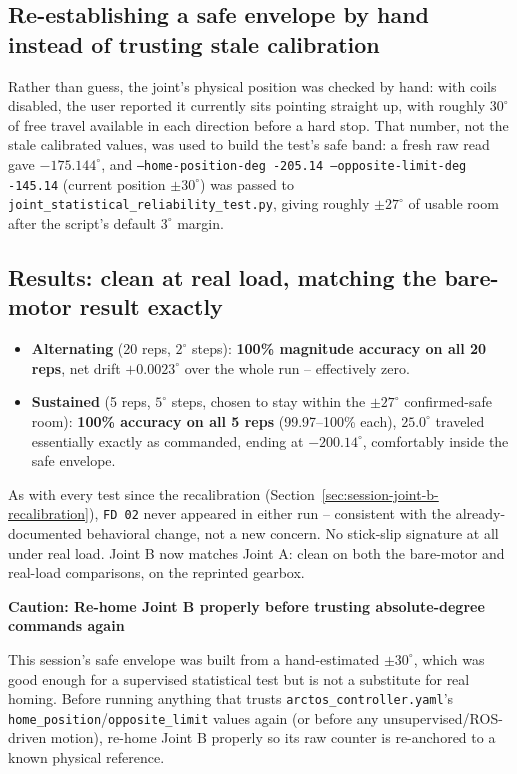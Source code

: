 \documentclass[11pt,letterpaper]{article}
\newenvironment{caution}[1]{%
    \par\addvspace{8pt}%
    \noindent{\color{cautionred}\rule{\linewidth}{0.8pt}}\par\vspace{2pt}
    \noindent\textbf{\color{cautionred}Caution: #1}\par\vspace{2pt}
}{%
    \par\vspace{2pt}\noindent{\color{cautionred}\rule{\linewidth}{0.4pt}}%
    \par\addvspace{8pt}%
}
\begin{document}
\subsection{Re-establishing a safe envelope by hand instead of trusting stale calibration}
Rather than guess, the joint's physical position was checked by hand: with coils disabled, the user reported it currently sits pointing straight up, with roughly $30^\circ$ of free travel available in each direction before a hard stop. That number, not the stale calibrated values, was used to build the test's safe band: a fresh raw read gave $-175.144^\circ$, and \texttt{--home-position-deg -205.14 --opposite-limit-deg -145.14} (current position $\pm 30^\circ$) was passed to \texttt{joint\_statistical\_reliability\_test.py}, giving roughly $\pm 27^\circ$ of usable room after the script's default $3^\circ$ margin.

\subsection{Results: clean at real load, matching the bare-motor result exactly}
\begin{itemize}
    \item \textbf{Alternating} (20 reps, $2^\circ$ steps): \textbf{100\% magnitude accuracy on all 20 reps}, net drift $+0.0023^\circ$ over the whole run -- effectively zero.
    \item \textbf{Sustained} (5 reps, $5^\circ$ steps, chosen to stay within the $\pm 27^\circ$ confirmed-safe room): \textbf{100\% accuracy on all 5 reps} (99.97--100\% each), $25.0^\circ$ traveled essentially exactly as commanded, ending at $-200.14^\circ$, comfortably inside the safe envelope.
\end{itemize}
As with every test since the recalibration (Section~\ref{sec:session-joint-b-recalibration}), \texttt{FD 02} never appeared in either run -- consistent with the already-documented behavioral change, not a new concern. No stick-slip signature at all under real load. Joint B now matches Joint A: clean on both the bare-motor and real-load comparisons, on the reprinted gearbox.

\begin{caution}{Re-home Joint B properly before trusting absolute-degree commands again}
This session's safe envelope was built from a hand-estimated $\pm 30^\circ$, which was good enough for a supervised statistical test but is not a substitute for real homing. Before running anything that trusts \texttt{arctos\_controller.yaml}'s \texttt{home\_position}/\texttt{opposite\_limit} values again (or before any unsupervised/ROS-driven motion), re-home Joint B properly so its raw counter is re-anchored to a known physical reference.
\end{caution}
\end{document}
